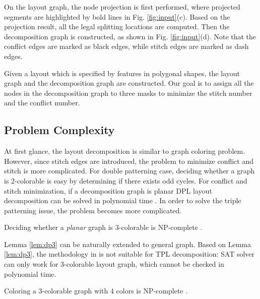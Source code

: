 \documentclass[10pt,conference]{IEEEtran}
\begin{document}
On the layout graph, the node projection is first performed, where projected segments are highlighted by bold lines in Fig. \ref{fig:input}(c).
Based on the projection result, all the legal splitting locations are computed.
Then the decomposition graph is constructed, as shown in Fig. \ref{fig:input}(d).
Note that the conflict edges are marked as black edges, while stitch edges are marked as dash edges.




\begin{problem}
Given a layout which is specified by features in polygonal shapes, the layout graph and the decomposition graph are constructed.
Our goal is to assign all the nodes in the decomposition graph to three masks to minimize the stitch number and the conflict number.
\end{problem}



\subsection{Problem Complexity}

At first glance, the layout decomposition is similar to graph coloring problem.
However, since stitch edges are introduced, the problem to minimize conflict and stitch is more complicated.
For double patterning case, deciding whether a graph is 2-colorable is easy by determining if there exists odd cycles.
For conflict and stitch minimization, if a decomposition graph is planar DPL layout decomposition can be solved in polynomial time \cite{DPL_ISPD2010_Xu}.
In order to solve the triple patterning issue, the problem becomes more complicated.

\begin{lemma}
\label{lem:dp3}
Deciding whether a \textit{planar} graph is 3-colorable is NP-complete \cite{1976Garey}.
\end{lemma}



Lemma \ref{lem:dp3} can be naturally extended to general graph.
Based on Lemma \ref{lem:dp3}, the methodology in \cite{TPL_SPIE08_Cork} is not suitable for TPL decomposition:
SAT solver can only work for 3-colorable layout graph, which cannot be checked in polynomial time.

\begin{lemma}
Coloring a 3-colorable graph with 4 colors is NP-complete \cite{1992Khanna}.
\label{lem:assign4color}
\end{lemma}
\end{document}
